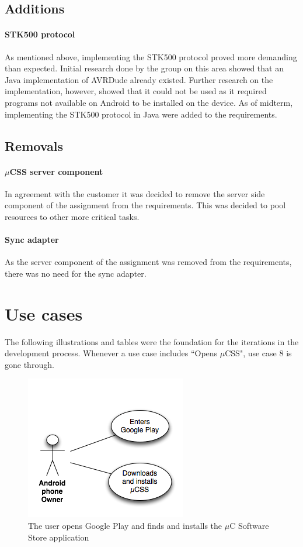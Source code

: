 \subsection{Additions}
\paragraph{STK500 protocol} As mentioned above, implementing the STK500 protocol proved more demanding than expected. Initial research done by the group on this area showed that an Java implementation of AVRDude already existed. Further research on the implementation, however, showed that it could not be used as it required programs not available on Android to be installed on the device. As of midterm, implementing the STK500 protocol in Java were added to the requirements.

\subsection{Removals}
\label{removals}
\paragraph{$\mu$CSS server component} In agreement with the customer it was decided to remove the server side component of the assignment from the requirements. This was decided to pool resources to other more critical tasks.

\paragraph{Sync adapter} As the server component of the assignment was removed from the requirements, there was no need for the sync adapter.

\section{Use cases}
\label{usecases}
The following illustrations and tables were the foundation for the iterations in the development process. Whenever a use case includes ``Opens $\mu$CSS", use case 8 is gone through. 

\begin{figure}[H]
\centering
\includegraphics[scale=0.7]{images/UseCase1}
\caption[Yse case 1]{The user opens Google Play and finds and installs the $\mu$C Software Store application}
\end{figure}

